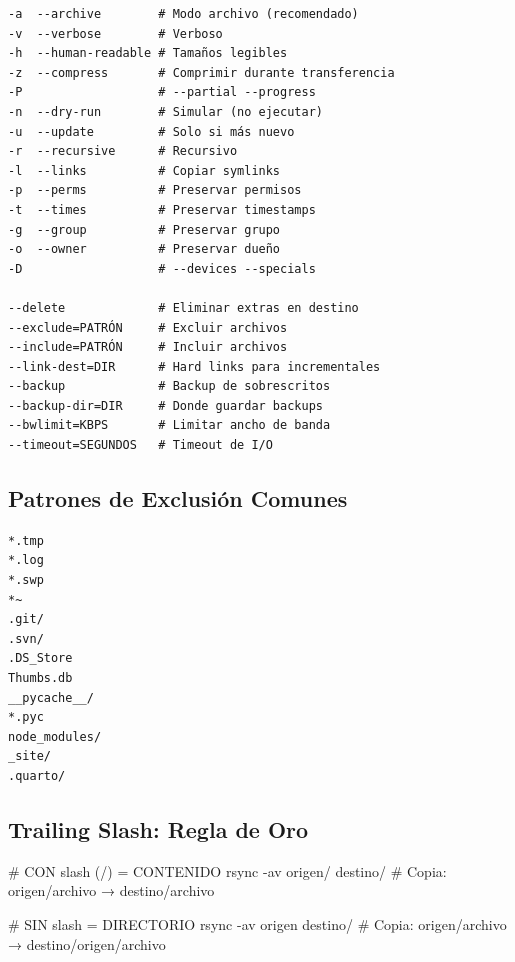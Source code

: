 \documentclass[
  doc,
  floatsintext,
  longtable,
  a4paper,
  nolmodern,
  notxfonts,
  notimes,
  12pt,
  colorlinks=true,linkcolor=blue,citecolor=blue,urlcolor=blue]{apa7}
\newenvironment{Shaded}{\begin{snugshade}}{\end{snugshade}}
\newcommand{\AttributeTok}[1]{\textcolor[rgb]{0.40,0.45,0.13}{#1}}
\newcommand{\CommentTok}[1]{\textcolor[rgb]{0.37,0.37,0.37}{#1}}
\newcommand{\FunctionTok}[1]{\textcolor[rgb]{0.28,0.35,0.67}{#1}}
\newcommand{\NormalTok}[1]{\textcolor[rgb]{0.00,0.23,0.31}{#1}}
\begin{document}
\begin{verbatim}
-a  --archive        # Modo archivo (recomendado)
-v  --verbose        # Verboso
-h  --human-readable # Tamaños legibles
-z  --compress       # Comprimir durante transferencia
-P                   # --partial --progress
-n  --dry-run        # Simular (no ejecutar)
-u  --update         # Solo si más nuevo
-r  --recursive      # Recursivo
-l  --links          # Copiar symlinks
-p  --perms          # Preservar permisos
-t  --times          # Preservar timestamps
-g  --group          # Preservar grupo
-o  --owner          # Preservar dueño
-D                   # --devices --specials

--delete             # Eliminar extras en destino
--exclude=PATRÓN     # Excluir archivos
--include=PATRÓN     # Incluir archivos
--link-dest=DIR      # Hard links para incrementales
--backup             # Backup de sobrescritos
--backup-dir=DIR     # Donde guardar backups
--bwlimit=KBPS       # Limitar ancho de banda
--timeout=SEGUNDOS   # Timeout de I/O
\end{verbatim}

\subsection{Patrones de Exclusión
Comunes}\label{patrones-de-exclusiuxf3n-comunes}

\begin{verbatim}
*.tmp
*.log
*.swp
*~
.git/
.svn/
.DS_Store
Thumbs.db
__pycache__/
*.pyc
node_modules/
_site/
.quarto/
\end{verbatim}

\subsection{Trailing Slash: Regla de
Oro}\label{trailing-slash-regla-de-oro}

\begin{Shaded}
\begin{Highlighting}[]
\CommentTok{\# CON slash (/) = CONTENIDO}
\FunctionTok{rsync} \AttributeTok{{-}av}\NormalTok{ origen/ destino/}
\CommentTok{\# Copia: origen/archivo → destino/archivo}

\CommentTok{\# SIN slash = DIRECTORIO}
\FunctionTok{rsync} \AttributeTok{{-}av}\NormalTok{ origen destino/}
\CommentTok{\# Copia: origen/archivo → destino/origen/archivo}
\end{Highlighting}
\end{Shaded}
\end{document}
